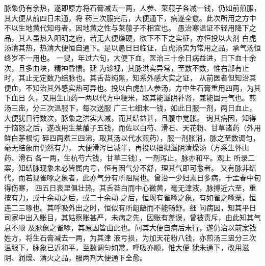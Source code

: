 \documentclass[a4paper,12pt,UTF8,twoside]{ctexbook}
\begin{document}
脉象仍有余热，遂即原方将石膏减去一两，人参、莱菔子各减一钱，仍如前煎服，其大便从前四日未通，将 
药三次服完后，大便通下，病遂全愈。此次所用之方中不以生地黄代知母者，因地黄之性与莱菔子不相宜也。 
愚治寒温证不轻用降下之品，其人虽热入阳明之府，若无大便燥硬，欲下不下之实征，亦恒投以大剂 
白虎汤清其热，热清大便恒自通下。是以愚日日临证，白虎汤实为常用之品，承气汤恒终岁不一用也。 
一叟，年过六旬，大便下血，医治三十余日病益进，日下血十余次，且多血块，精神昏愦。延 
为诊视，其脉洪实异常，至数不数，惟右部有止时，其止无定数乃结脉也。其舌苔纯黑，知系外感大实之证， 
从前医者但知治其便血，不知治其外感实热可异也。投以白虎加人参汤，方中生石膏重用四两，为其下血日 
久，又用生山药一两以代方中粳米，取其能滋阴补肾，兼能固元气也。煎汤三盅，分三次温服下，每次送服 
广三七细末一钱，如此日服一剂，两日血止，大便犹日行数次，脉象之洪实大减，而其结益甚，且腹中觉胀。 
询其病因，知得于恼怒之后，遂改用生莱菔子五钱，而佐以白芍、滑石、天花粉、甘草诸药（外用鲜白茅根切 
碎四两煮三四沸，取其汤以代水煎药），服一剂胀消，脉之至数调匀，毫无结象而仍然有力， 
大便滑泻已减半，再投以拙拟滋阴清燥汤（方系生怀山药、滑石 
各一两，生杭芍六钱，甘草三钱），一剂泻止，脉亦和平。观上 
所录二案，知结脉现象未必皆属内亏，恒有因气分不舒，理其气即可愈者。 
又有脉非结代，而若现雀啄之象者，此亦气分有所阻隔也。曾治一少妇素日多病，于孟春中旬得伤寒， 
四五日表里俱壮热，其舌苔白而中心微黄，毫无津液，脉搏近六至，重按有力，或十余动之后，或二十余动 
之后，恒现有雀啄之象，有如雀之啄粟，恒连二三啄也。其呼吸外出之时，恒似有所龃龉而不能畅舒。细 
问病因，知其平日司家中出入账目，其姑察账甚严，未病之先，因账有差误，曾被责斥，由此知其气息不顺 
及脉象之雀啄，其原因皆由此也。问其大便自病后未行，遂仍治以前案钱姓方，将生石膏减去一两，为其津 
液亏损，为加天花粉八钱，亦煎汤三盅分三次温服下，脉象已近和平，至数调匀如常，呼吸亦顺，惟大便 
犹未通下，改用滋阴、润燥、清火之品，服两剂大便通下全愈。 
\end{document}
